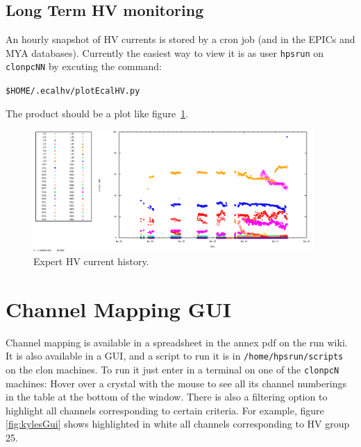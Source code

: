 \documentclass[12pt]{article}
\begin{document}
{   \subsection{Long Term HV monitoring}

   An hourly snapshot of HV currents is stored by a cron job (and in the EPICs and MYA databases).  Currently the easiest way to view it is as user \texttt{hpsrun} on \texttt{clonpcNN} by excuting the command:
   \begin{center}
   \texttt{\$HOME/.ecalhv/plotEcalHV.py}
   \end{center}
The product should be a plot like figure~\ref{HVhistory}.

\begin{figure}[htbp]
\center
\includegraphics[width=0.95\textwidth]{pics/ECALHVCURRENTS_2014_12_20.png}
\caption{\small \label{HVhistory} Expert HV current history.}
\end{figure}

\section{Channel Mapping GUI}
Channel mapping is available in a spreadsheet in the annex pdf on the run wiki. It is also available in a GUI, and a script to run it is in \texttt{/home/hpsrun/scripts} on the clon machines.  To run it just enter in a terminal on one of the \texttt{clonpcN} machines:
{}\newline\newline
Hover over a crystal with the mouse to see all its channel numberings in the table at the bottom of the window.  There is also a filtering option to highlight all channels corresponding to certain criteria.  For example, figure \ref{fig:kylesGui} shows highlighted in white all channels corresponding to HV group 25.

}
\end{document}
